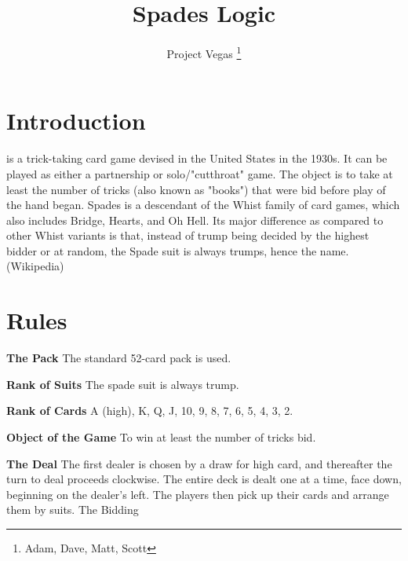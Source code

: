 \documentclass[journal, a4paper]{Spades_Logic_Dependency/IEEEtran}
\begin{document}
	\title{Spades Logic}
	\author{Project Vegas
	\thanks{Adam, Dave, Matt, Scott}}
	\maketitle



\section{Introduction}
	 is a trick-taking card game devised in the United States in the 1930s. It can be played as either a partnership or solo/"cutthroat" game. The object is to take at least the number of tricks (also known as "books") that were bid before play of the hand began. Spades is a descendant of the Whist family of card games, which also includes Bridge, Hearts, and Oh Hell. Its major difference as compared to other Whist variants is that, instead of trump being decided by the highest bidder or at random, the Spade suit is always trumps, hence the name. (Wikipedia)

\section{Rules}
	
\textbf{The Pack} \newline
The standard 52-card pack is used.\newline

\textbf{Rank of Suits} \newline
The spade suit is always trump.\newline

\textbf{Rank of Cards}\newline
A (high), K, Q, J, 10, 9, 8, 7, 6, 5, 4, 3, 2.\newline

\textbf{Object of the Game}\newline
To win at least the number of tricks bid.\newline

\textbf{The Deal} \newline
The first dealer is chosen by a draw for high card, and thereafter the turn to deal proceeds clockwise. The entire deck is dealt one at a time, face down, beginning on the dealer's left. The players then pick up their cards and arrange them by suits.
The Bidding
\end{document}
